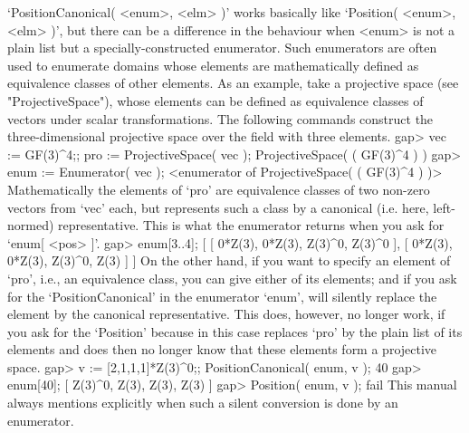 `PositionCanonical( <enum>,  <elm> )'  works  basically  like  `Position(
<enum>, <elm>  )', but there  can be a  difference in the  behaviour when
<enum> is  not a plain list  but a specially-constructed enumerator. Such
enumerators  are   often used  to   enumerate domains  whose elements are
mathematically defined as equivalence classes   of other elements. As  an
example, take a projective space  (see "ProjectiveSpace"), whose elements
can be defined     as  equivalence  classes  of  vectors    under  scalar
transformations.  The     following   {\GAP}   commands    construct  the
three-dimensional projective space over the field with three elements.
\begintt
    gap> vec := GF(3)^4;;  pro := ProjectiveSpace( vec );
    ProjectiveSpace( ( GF(3)^4 ) )
    gap> enum := Enumerator( vec );
    <enumerator of ProjectiveSpace( ( GF(3)^4 ) )>
\endtt
Mathematically  the elements  of `pro'   are  equivalence classes  of two
non-zero vectors from `vec' each, but {\GAP} represents such a class by a
canonical  (i.e. here, left-normed)  representative.   This is what   the
enumerator returns when you ask for `enum[ <pos> ]'.
\begintt
    gap> enum{[3..4]};
    [ [ 0*Z(3), 0*Z(3), Z(3)^0, Z(3)^0 ], [ 0*Z(3), 0*Z(3), Z(3)^0, Z(3) ] ]
\endtt
On the other hand, if you want to  specify an element  of `pro', i.e., an
equivalence class,  you can give either  of its elements;  and if you ask
for  the   `PositionCanonical'  in  the   enumerator `enum',  {\GAP} will
silently replace the element by the  canonical representative. This does,
however, no  longer work, if you ask  for the `Position'  because in this
case {\GAP} replaces `pro'  by the plain  list  of its elements  and does
then no longer know that these elements form a projective space.
\begintt
    gap> v := [2,1,1,1]*Z(3)^0;;  PositionCanonical( enum, v );
    40
    gap> enum[40];
    [ Z(3)^0, Z(3), Z(3), Z(3) ]
    gap> Position( enum, v );
    fail
\endtt
This  manual always mentions explicitly when  such a silent conversion is
done by an enumerator.



